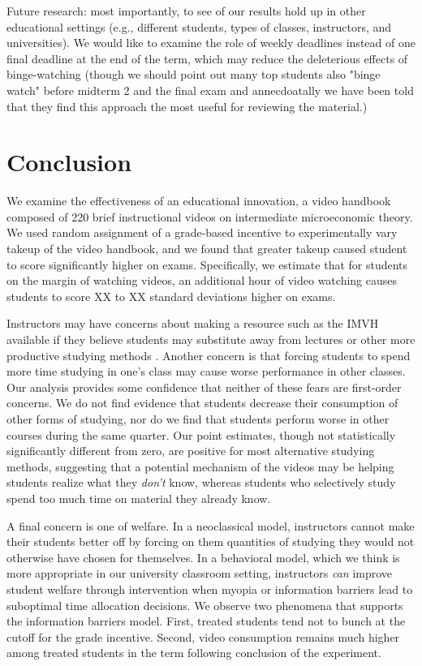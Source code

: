\documentclass[12pt]{article}
\begin{document}
Future research: most importantly, to see of our results hold up in other educational settings (e.g., different students, types of classes, instructors, and universities). We would like to examine the role of weekly deadlines instead of one final deadline at the end of the term, which may reduce the deleterious effects of binge-watching (though we should point out many top students also "binge watch" before midterm 2 and the final exam and annecdoatally we have been told that they find this approach the most useful for reviewing the material.)



\section{Conclusion} \label{conclusion}

We examine the effectiveness of an educational innovation, a video handbook composed of 220 brief instructional videos on intermediate microeconomic theory. We used random assignment of a grade-based incentive to experimentally vary takeup of the video handbook, and we found that greater takeup caused student to score significantly higher on exams. Specifically, we estimate that for students on the margin of watching videos, an additional hour of video watching causes students to score XX to XX standard deviations higher on exams.

Instructors may have concerns about making a resource such as the IMVH available if they believe students may substitute away from lectures or other more productive studying methods \textcite{kay2012}. Another concern is that forcing students to spend more time studying in one's class may cause worse performance in other classes. Our analysis provides some confidence that neither of these fears are first-order concerns. We do not find evidence that students decrease their consumption of other forms of studying, nor do we find that students perform worse in other courses during the same quarter. Our point estimates, though not statistically significantly different from zero, are positive for most alternative studying methods, suggesting that a potential mechanism of the videos may be helping students realize what they \textit{don't} know, whereas students who selectively study spend too much time on material they already know.

A final concern is one of welfare. In a neoclassical model, instructors cannot make their students better off by forcing on them quantities of studying they would not otherwise have chosen for themselves. In a behavioral model, which we think is more appropriate in our university classroom setting, instructors \textit{can} improve student welfare through intervention when myopia or information barriers lead to suboptimal time allocation decisions. We observe two phenomena that supports the information barriers model. First, treated students tend not to bunch at the cutoff for the grade incentive. Second, video consumption remains much higher among treated students in the term following conclusion of the experiment.
\end{document}
